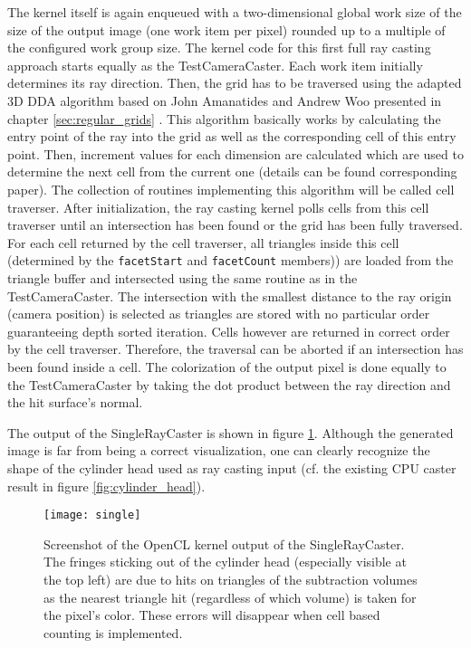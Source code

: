 The kernel itself is again enqueued with a two-dimensional global work size of the size of the output image (one work item per pixel) rounded up to a multiple of the configured work group size. The kernel code for this first full ray casting approach starts equally as the TestCameraCaster. Each work item initially determines its ray direction. Then, the grid has to be traversed using the adapted 3D DDA algorithm based on John Amanatides and Andrew Woo presented in chapter \ref{sec:regular_grids} \cite{3DDDA}. This algorithm basically works by calculating the entry point of the ray into the grid as well as the corresponding cell of this entry point. Then, increment values for each dimension are calculated which are used to determine the next cell from the current one (details can be found corresponding paper). The collection of routines implementing this algorithm will be called cell traverser. After initialization, the ray casting kernel polls cells from this cell traverser until an intersection has been found or the grid has been fully traversed. For each cell returned by the cell traverser, all triangles inside this cell (determined by the \lstinline!facetStart! and \lstinline!facetCount! members)) are loaded from the triangle buffer and intersected using the same routine as in the TestCameraCaster. The intersection with the smallest distance to the ray origin (camera position) is selected as triangles are stored with no particular order guaranteeing depth sorted iteration. Cells however are returned in correct order by the cell traverser. Therefore, the traversal can be aborted if an intersection has been found inside a cell. The colorization of the output pixel is done equally to the TestCameraCaster by taking the dot product between the ray direction and the hit surface's normal.

The output of the SingleRayCaster is shown in figure \ref{fig:single}. Although the generated image is far from being a correct visualization, one can clearly recognize the shape of the cylinder head used as ray casting input (cf. the existing CPU caster result in figure \ref{fig:cylinder_head}).

\begin{figure}
\centering
\texttt{[image: single]}
\caption{Screenshot of the OpenCL kernel output of the SingleRayCaster. The fringes sticking out of the cylinder head (especially visible at the top left) are due to hits on triangles of the subtraction volumes as the nearest triangle hit (regardless of which volume) is taken for the pixel's color. These errors will disappear when cell based counting is implemented.}
\label{fig:single}
\end{figure}


